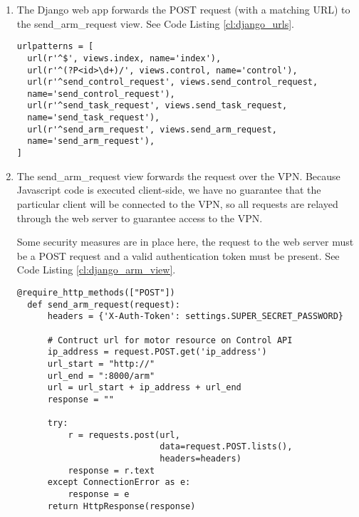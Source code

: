 \begin{enumerate}
\item The Django web app forwards the \gls{POST} request (with a matching URL) to the send\_arm\_request view. See Code Listing \ref{cl:django_urls}.
\newline

\begin{lstlisting}[style=custompython, caption=Django URL Dispatcher, label=cl:django_urls]
urlpatterns = [
  url(r'^$', views.index, name='index'),
  url(r'^(?P<id>\d+)/', views.control, name='control'),
  url(r'^send_control_request', views.send_control_request,
  name='send_control_request'),
  url(r'^send_task_request', views.send_task_request,
  name='send_task_request'),
  url(r'^send_arm_request', views.send_arm_request,
  name='send_arm_request'),
]
\end{lstlisting}

\item The send\_arm\_request view forwards the request over the \gls{VPN}. Because Javascript code is executed client-side, we have no guarantee that the particular client will be connected to the VPN, so all requests are relayed through the web server to guarantee access to the \gls{VPN}.

Some security measures are in place here, the request to the web server must be a \gls{POST} request and a valid authentication token must be present. See Code Listing \ref{cl:django_arm_view}.
\newline

  \begin{lstlisting}[style=custompython, caption=Django Arm Request Forwarding View, label=cl:django_arm_view]
  @require_http_methods(["POST"])
  def send_arm_request(request):
      headers = {'X-Auth-Token': settings.SUPER_SECRET_PASSWORD}

      # Contruct url for motor resource on Control API
      ip_address = request.POST.get('ip_address')
      url_start = "http://"
      url_end = ":8000/arm"
      url = url_start + ip_address + url_end
      response = ""

      try:
          r = requests.post(url,
                            data=request.POST.lists(),
                            headers=headers)
          response = r.text
      except ConnectionError as e:
          response = e
      return HttpResponse(response)
  \end{lstlisting}

\end{enumerate}

